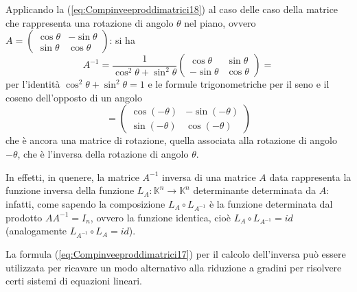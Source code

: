 \begin{es}
  \label{es:Compinveeproddimatrici3}
  Applicando la (\ref{eq:Compinveeproddimatrici18}) al caso delle caso della matrice che rappresenta una
  rotazione di angolo $\theta$ nel piano, ovvero $A=
  \begin{pmatrix}
    \cos \theta & -\sin \theta\\
    \sin\theta & \cos \theta
  \end{pmatrix}
  $: si ha
  \begin{equation*}
    A^{-1}=\frac{1}{\cos^2\theta+\sin^2\theta}
    \begin{pmatrix}
      \cos\theta & \sin\theta\\
      -\sin\theta & \cos\theta
    \end{pmatrix}=
  \end{equation*}
  per l'identità $\cos^2\theta+\sin^2\theta=1$ e le formule trigonometriche per il seno e il coseno
  dell'opposto di un angolo
  \begin{equation*}
    =
    \begin{pmatrix}
      \cos(-\theta) & -\sin(-\theta)\\
      \sin(-\theta) & \cos(-\theta)
    \end{pmatrix}
  \end{equation*}
  che è ancora una matrice di rotazione, quella associata alla rotazione di angolo $-\theta$, che è
  l'inversa della rotazione di angolo $\theta$.
  
  In effetti, in quenere, la matrice $A^{-1}$ inversa di una matrice $A$ data rappresenta la funzione
  inversa della funzione $L_A:\mathds{K}^n\to \mathds{K}^n$ determinante determinata da $A$: infatti,
  come sapendo la composizione $L_A\circ L_{A^{-1}}$ è la funzione determinata dal prodotto $AA^{-1}=I_n$,
  ovvero la funzione identica, cioè $L_A\circ L_{A^{-1}}=id$ (analogamente $L_{A^{-1}}\circ L_A=id$).
\end{es}
La formula (\ref{eq:Compinveeproddimatrici17}) per il calcolo dell'inversa può essere utilizzata per
ricavare un modo alternativo alla riduzione a gradini per risolvere certi sistemi di equazioni lineari.

